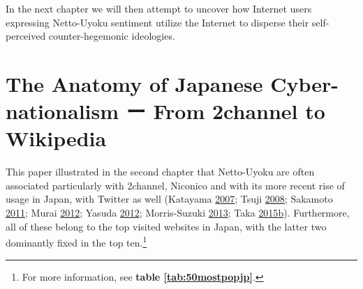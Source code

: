\documentclass[10pt,british,A4paper,twoside]{memoir}
\begin{document}
In the next chapter we will then attempt to uncover how Internet users
expressing Netto-Uyoku sentiment utilize the Internet to disperse their
self-perceived counter-hegemonic ideologies.

\chapter{The Anatomy of Japanese Cyber-nationalism ー From 2channel to
Wikipedia}\label{the-anatomy-of-japanese-cyber-nationalism-ux30fc-from-2channel-to-wikipedia}

This paper illustrated in the second chapter that Netto-Uyoku are often
associated particularly with 2channel, Niconico and with its more recent
rise of usage in Japan, with Twitter as well (Katayama
\protect\hyperlink{ref-katayama_2-channel_2007}{2007}; Tsuji
\protect\hyperlink{ref-tsuji_eng:_2008}{2008}; Sakamoto
\protect\hyperlink{ref-sakamoto_koreans_2011}{2011}; Murai
\protect\hyperlink{ref-murai_net_2012}{2012}; Yasuda
\protect\hyperlink{ref-yasuda_eng:_2012}{2012}; Morris-Suzuki
\protect\hyperlink{ref-morris-suzuki_freedom_2013}{2013}; Taka
\protect\hyperlink{ref-taka_twitter_2015-1}{2015}\protect\hyperlink{ref-taka_twitter_2015-1}{b}).
Furthermore, all of these belong to the top visited websites in Japan,
with the latter two dominantly fixed in the top ten.\footnote{For more
  information, see \textbf{table \ref{tab:50mostpopjp}}.}
\end{document}
